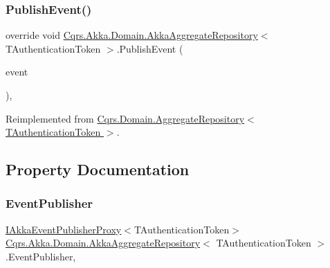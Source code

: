 \subsubsection{\texorpdfstring{Publish\+Event()}{PublishEvent()}}
{\footnotesize\ttfamily override void \hyperlink{classCqrs_1_1Akka_1_1Domain_1_1AkkaAggregateRepository}{Cqrs.\+Akka.\+Domain.\+Akka\+Aggregate\+Repository}$<$ T\+Authentication\+Token $>$.Publish\+Event (\begin{DoxyParamCaption}\item[{\hyperlink{interfaceCqrs_1_1Events_1_1IEvent}{I\+Event}$<$ T\+Authentication\+Token $>$ @}]{event }\end{DoxyParamCaption})\hspace{0.3cm}{\ttfamily [protected]}, {\ttfamily [virtual]}}



Reimplemented from \hyperlink{classCqrs_1_1Domain_1_1AggregateRepository_a3191ba3d6fa4f6b904128c4731262944_a3191ba3d6fa4f6b904128c4731262944}{Cqrs.\+Domain.\+Aggregate\+Repository$<$ T\+Authentication\+Token $>$}.



\subsection{Property Documentation}
\mbox{\label{classCqrs_1_1Akka_1_1Domain_1_1AkkaAggregateRepository_a6c6400aef33fd3ec5dc3e479ebec6b40_a6c6400aef33fd3ec5dc3e479ebec6b40}} 
\subsubsection{\texorpdfstring{Event\+Publisher}{EventPublisher}}
{\footnotesize\ttfamily \hyperlink{interfaceCqrs_1_1Akka_1_1Events_1_1IAkkaEventPublisherProxy}{I\+Akka\+Event\+Publisher\+Proxy}$<$T\+Authentication\+Token$>$ \hyperlink{classCqrs_1_1Akka_1_1Domain_1_1AkkaAggregateRepository}{Cqrs.\+Akka.\+Domain.\+Akka\+Aggregate\+Repository}$<$ T\+Authentication\+Token $>$.Event\+Publisher\hspace{0.3cm}{\ttfamily [get]}, {\ttfamily [protected]}}

